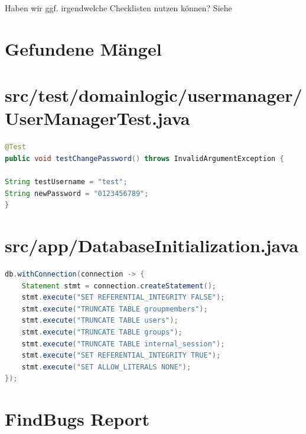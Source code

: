 \documentclass[12pt,DIV14,BCOR10mm,a4paper,twoside,parskip=half-,headsepline,headinclude,english,ngerman,bibliography=totocnumbered]{scrreprt}
\begin{document}
Haben wir ggf. irgendwelche Checklisten nutzen können?
Siehe

\chapter{Gefundene Mängel}

\printbibliography

\printacronyms[title=Abkürzungsverzeichnis,toctitle=Abkürzungsverzeichnis]
\printglossary[type=main]

\listoffigures      %


\begin{appendices}

\chapter{src/test/domainlogic/usermanager/UserManagerTest.java}
\begin{lstlisting}[language=Java,caption=Hardkodiertes Passwort in einem Test aus der Klasse \texttt{UserManagerTest},label={lst:staticanalysis-hardcoded-pw}]
@Test
public void testChangePassword() throws InvalidArgumentException {

String testUsername = "test";
String newPassword = "0123456789";
}
\end{lstlisting}

\chapter{src/app/DatabaseInitialization.java}
\begin{lstlisting}[language=Java,caption=Von SecureAssist gefundenes False Positive Beispiel für Query Injections,label={lst:staticanalysis-query-injection}]
db.withConnection(connection -> {
	Statement stmt = connection.createStatement();
	stmt.execute("SET REFERENTIAL_INTEGRITY FALSE");
	stmt.execute("TRUNCATE TABLE groupmembers");
	stmt.execute("TRUNCATE TABLE users");
	stmt.execute("TRUNCATE TABLE groups");
	stmt.execute("TRUNCATE TABLE internal_session");
	stmt.execute("SET REFERENTIAL_INTEGRITY TRUE");
	stmt.execute("SET ALLOW_LITERALS NONE");
});
\end{lstlisting}

\chapter{FindBugs Report}
\label{staticanalysis-find-bugs}
%

\end{appendices}
\end{document}
